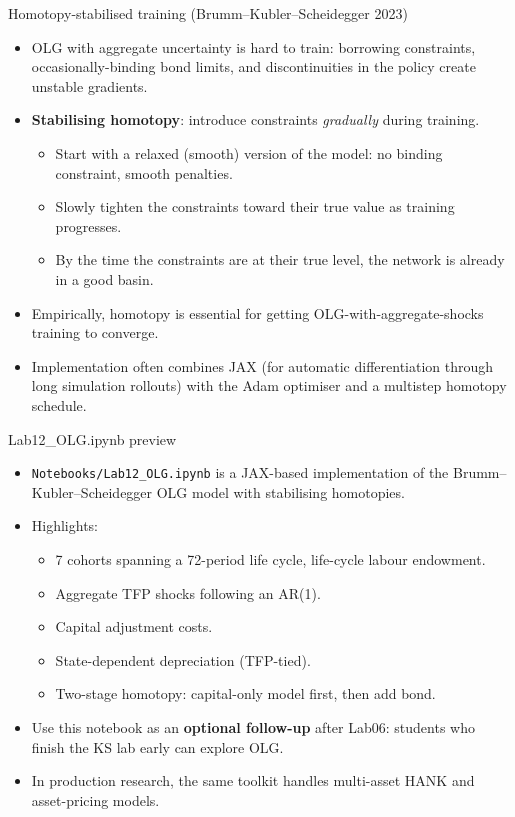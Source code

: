\documentclass[10pt,english,aspectratio=169]{beamer}
\begin{document}
\begin{frame}{Homotopy-stabilised training (Brumm--Kubler--Scheidegger 2023)}
\begin{itemize}
\item OLG with aggregate uncertainty is hard to train: borrowing constraints, occasionally-binding bond limits, and discontinuities in the policy create unstable gradients.
\medskip
\item \textbf{Stabilising homotopy}: introduce constraints \emph{gradually} during training.
  \begin{itemize}
  \item Start with a relaxed (smooth) version of the model: no binding constraint, smooth penalties.
  \item Slowly tighten the constraints toward their true value as training progresses.
  \item By the time the constraints are at their true level, the network is already in a good basin.
  \end{itemize}
\medskip
\item Empirically, homotopy is essential for getting OLG-with-aggregate-shocks training to converge.
\medskip
\item Implementation often combines JAX (for automatic differentiation through long simulation rollouts) with the Adam optimiser and a multistep homotopy schedule.
\end{itemize}
\end{frame}

\begin{frame}{Lab12\_OLG.ipynb preview}
\begin{itemize}
\item \texttt{Notebooks/Lab12\_OLG.ipynb} is a JAX-based implementation of the Brumm--Kubler--Scheidegger OLG model with stabilising homotopies.
\medskip
\item Highlights:
  \begin{itemize}
  \item 7 cohorts spanning a 72-period life cycle, life-cycle labour endowment.
  \item Aggregate TFP shocks following an AR(1).
  \item Capital adjustment costs.
  \item State-dependent depreciation (TFP-tied).
  \item Two-stage homotopy: capital-only model first, then add bond.
  \end{itemize}
\medskip
\item Use this notebook as an \textbf{optional follow-up} after Lab06: students who finish the KS lab early can explore OLG.
\medskip
\item In production research, the same toolkit handles multi-asset HANK and asset-pricing models.
\end{itemize}
\end{frame}
\end{document}
